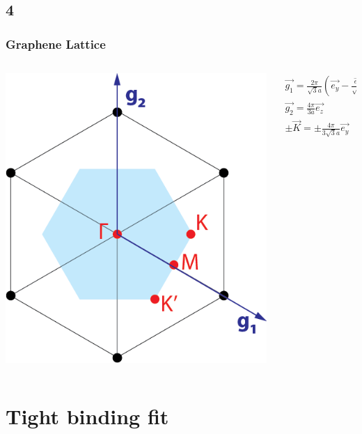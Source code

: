 \documentclass{beamer}
\begin{document}
	\subsection*{4}
		\begin{frame}
			\frametitle{Graphene Lattice}
			\centering
			\begin{columns}[T] %
				\begin{column}{.48\textwidth}
					\includegraphics[width=\textwidth]{figures/grapheneBrillouin.png}
				\end{column}%
				\hfill%
				\begin{column}{.48\textwidth}
					\begin{align}
						\vec{g_1} = \frac{2\pi}{\sqrt{3}a} (\vec{e_y} - \frac{\vec{e_z}}{\sqrt{3}}) \\
						 \vec{g_2} = \frac{4 \pi}{3a} \vec{e_z} \\
						 \pm \vec{K} = \pm \frac{4 \pi}{3 \sqrt{3}a}\vec{e_y}
					\end{align}
				\end{column}%
			\end{columns}				
		\end{frame}

\section{Tight binding fit}
\end{document}
